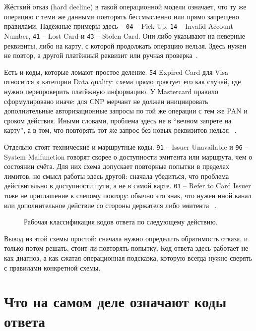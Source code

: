 Жёсткий отказ (hard decline) в такой операционной модели означает, что ту
же операцию с теми же данными повторять бессмысленно или прямо запрещено
правилами. Надёжные примеры здесь -- \texttt{04} -- Pick Up, \texttt{14} --
Invalid Account Number, \texttt{41} -- Lost Card и \texttt{43} -- Stolen Card.
Они либо указывают на неверные реквизиты, либо на карту, с которой
продолжать операцию нельзя. Здесь нужен не повтор, а другой платёжный
реквизит или ручная проверка~\cite{visa-core-rules}\cite{mc-tpr}.

Есть и коды, которые ломают простое деление. \texttt{54} Expired Card для
Visa относится к категории Data quality: схема прямо трактует
его как случай, где нужно перепроверить платёжную информацию. У
Mastercard правило сформулировано иначе: для CNP мерчант не
должен инициировать дополнительные авторизационные запросы по той же
операции с тем же PAN и сроком действия. Иными словами, проблема здесь
не в \enquote{вечном запрете на карту}, а в том, что повторять тот же
запрос без новых реквизитов нельзя
~\cite{visa-core-rules}\cite{mc-tpr}.

Отдельно стоят технические и маршрутные коды. \texttt{91} -- Issuer
Unavailable и \texttt{96} -- System Malfunction говорят скорее о доступности
эмитента или маршрута, чем о состоянии счёта. Для них схема допускает
повторные попытки в пределах лимитов, но смысл работы здесь другой:
сначала убедиться, что проблема действительно в доступности пути, а не в
самой карте. \texttt{01} -- Refer to Card Issuer тоже не приглашение к
слепому повтору: обычно это знак, что нужен иной канал или
дополнительное действие со стороны держателя либо эмитента
~\cite{visa-core-rules}.

\begin{figure}
  \centering
  \caption{Рабочая классификация кодов ответа по следующему действию.}
  \label{fig:decline-codes}
\end{figure}

Вывод из этой схемы простой: сначала нужно определить обратимость
отказа, и только потом решать, стоит ли повторять попытку. Код ответа
здесь работает не как диагноз, а как сжатая операционная подсказка,
которую всегда нужно сверять с правилами конкретной схемы.

\section{Что на самом деле означают коды ответа}
\label{sec:decline-response-codes}

